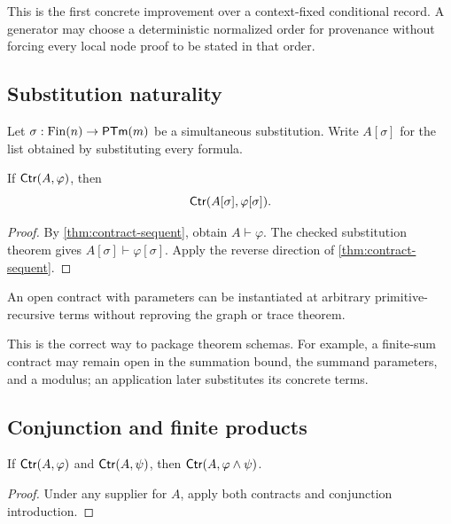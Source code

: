 This is the first concrete improvement over a context-fixed conditional record.  A generator may choose a deterministic normalized order for provenance without forcing every local node proof to be stated in that order.

\subsection{Substitution naturality}

Let \(\sigma:\mathrm{Fin}(n)\to\mathsf{PTm}(m)\) be a simultaneous substitution.  Write \(A[\sigma]\) for the list obtained by substituting every formula.

\begin{theorem}\label{thm:contract-subst}
If \(\mathsf{Ctr}(A,\varphi)\), then
\[
                     \mathsf{Ctr}(A[\sigma],\varphi[\sigma]).
\]
\end{theorem}

\begin{proof}
By \cref{thm:contract-sequent}, obtain \(A\vdash\varphi\).  The checked substitution theorem gives \(A[\sigma]\vdash\varphi[\sigma]\).  Apply the reverse direction of \cref{thm:contract-sequent}.
\end{proof}

\begin{corollary}[Specialization]
An open contract with parameters can be instantiated at arbitrary primitive-recursive terms without reproving the graph or trace theorem.
\end{corollary}

This is the correct way to package theorem schemas.  For example, a finite-sum contract may remain open in the summation bound, the summand parameters, and a modulus; an application later substitutes its concrete terms.

\subsection{Conjunction and finite products}

\begin{lemma}
If \(\mathsf{Ctr}(A,\varphi)\) and \(\mathsf{Ctr}(A,\psi)\), then
\(\mathsf{Ctr}(A,\varphi\wedge\psi)\).
\end{lemma}

\begin{proof}
Under any supplier for \(A\), apply both contracts and conjunction introduction.
\end{proof}

